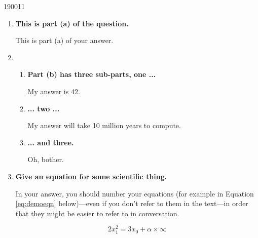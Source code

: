 \documentclass[10pt,\jkfside,a4paper]{article}
\begin{document}
 

\begin{examquestion}{1900}{1}{1}
 \begin{enumerate}
  \item
{\bf This is part (a) of the question.}

This is part (a) of your answer.

  \item
  \begin{enumerate}
   \item
{\bf Part (b) has three sub-parts, one ...}

My answer is 42.

   \item
{\bf ... two ...}

My answer will take 10 million years to compute.

   \item
{\bf ... and three.}

Oh, bother.

  \end{enumerate}

  \item
{\bf Give an equation for some scientific thing.}

In your answer, you should number your equations (for example in Equation \ref{eq:demoeqn} below)---even if you don't refer to them in the text---in order that they might be easier to refer to in conversation.

\begin{equation} \label{eq:demoeqn}
2x_1^2 =  3x_0 + \alpha \times \infty
\end{equation}

 \end{enumerate}
\end{examquestion}
\end{document}
